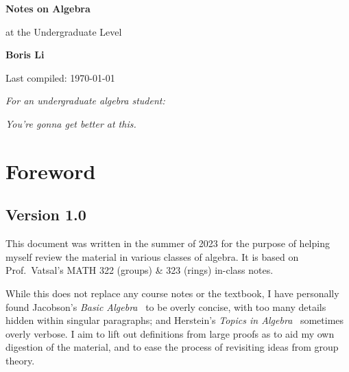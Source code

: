 \begin{titlepage}
\begin{center}
    \vspace*{1cm}
    {\Huge\textbf{Notes on Algebra}}

    \vspace{5mm}
    {\LARGE at the Undergraduate Level}

    \vspace{15mm}
    {\Large\textbf{Boris Li}}

    \vspace*{4cm}

    \vfill

    {\large Last compiled: \today}
\end{center}
\end{titlepage}

\vspace*{30mm}

\begin{center}
    \textit{For an undergraduate algebra student:}

    \vspace{5mm}

    \textit{You're gonna get better at this.}
\end{center}

\chapter*{Foreword}

\section*{Version 1.0}

This document was written in the summer of 2023
for the purpose of helping myself review the material
in various classes of algebra.
It is based on Prof.\ Vatsal's MATH 322 (groups) \& 323 (rings) in-class notes.

While this does not replace any course notes or the textbook,
I have personally found Jacobson's \textit{Basic Algebra}~\cite{jacobson}
to be overly concise,
with too many details hidden within singular paragraphs;
and Herstein's \textit{Topics in Algebra}~\cite{herstein} sometimes overly verbose.
I aim to lift out definitions from large proofs
as to aid my own digestion of the material,
and to ease the process of revisiting ideas from group theory.

